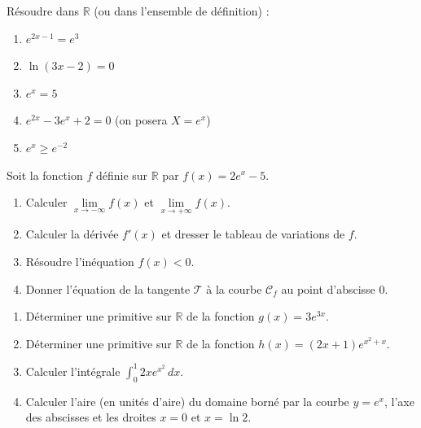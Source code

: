 \documentclass[11pt]{article}
\begin{document}
\begin{exercice}
Résoudre dans $\mathbb{R}$ (ou dans l'ensemble de définition) :
\begin{enumerate}
    \item $e^{2x-1} = e^3$
    \item $\ln(3x-2) = 0$
    \item $e^{x} = 5$
    \item $e^{2x} - 3e^x + 2 = 0$ \quad (on posera $X=e^x$)
    \item $e^{x} \geqslant e^{-2}$
\end{enumerate}
\end{exercice}

\begin{exercice}
Soit la fonction $f$ définie sur $\mathbb{R}$ par $f(x) = 2e^{x} - 5$.
\begin{enumerate}
    \item Calculer $\lim\limits_{x\to -\infty} f(x)$ et $\lim\limits_{x\to +\infty} f(x)$.
    \item Calculer la dérivée $f'(x)$ et dresser le tableau de variations de $f$.
    \item Résoudre l'inéquation $f(x) < 0$.
    \item Donner l'équation de la tangente $\mathcal{T}$ à la courbe $\mathcal{C}_f$ au point d'abscisse $0$.
\end{enumerate}
\end{exercice}

\begin{exercice}
\begin{enumerate}
    \item Déterminer une primitive sur $\mathbb{R}$ de la fonction $g(x) = 3e^{3x}$.
    \item Déterminer une primitive sur $\mathbb{R}$ de la fonction $h(x) = (2x+1)e^{x^2+x}$.
    \item Calculer l'intégrale $\displaystyle\int_0^1 2x e^{x^2}\,dx$.
    \item Calculer l'aire (en unités d'aire) du domaine borné par la courbe $y=e^x$, l'axe des abscisses et les droites $x=0$ et $x=\ln 2$.
\end{enumerate}
\end{exercice}
\end{document}
